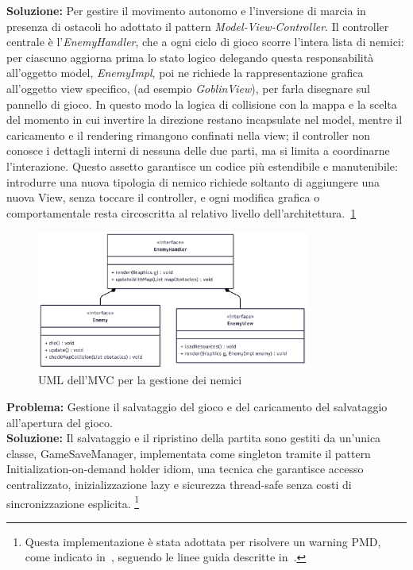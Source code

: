 \documentclass[a4paper,12pt]{report}
\begin{document}
\textbf{Soluzione:} Per gestire il movimento autonomo e l'inversione di marcia in presenza di ostacoli ho adottato 
il pattern \emph{Model‑View‑Controller}. Il controller centrale è l'\emph{EnemyHandler}, che a ogni ciclo di gioco scorre l'intera lista di 
nemici: per ciascuno aggiorna prima lo stato logico delegando questa responsabilità all'oggetto model, \emph{EnemyImpl}, poi ne richiede 
la rappresentazione grafica all'oggetto view specifico, (ad esempio \emph{GoblinView}), per farla disegnare sul pannello di gioco. In questo modo 
la logica di collisione con la mappa e la scelta del momento in cui invertire la direzione restano incapsulate nel model, 
mentre il caricamento e il rendering rimangono confinati nella view; il controller non conosce i dettagli interni di nessuna delle due parti, 
ma si limita a coordinarne l'interazione. 
Questo assetto garantisce un codice più estendibile e manutenibile: introdurre una nuova tipologia di nemico richiede soltanto 
di aggiungere una nuova View, senza toccare il controller, e ogni modifica grafica o comportamentale resta circoscritta al relativo livello dell'architettura.~\ref{fig:2.9}
\begin{figure}
    \centering
    \includegraphics[width=0.8\textwidth]{resources/enemyMvcUml.png}
    \caption{UML dell'MVC per la gestione dei nemici}
    \label{fig:2.9}
\end{figure}
\newpage
\textbf{Problema:} Gestione il salvataggio del gioco e del caricamento del salvataggio all'apertura del gioco.\\
\textbf{Soluzione:} Il salvataggio e il ripristino della partita sono gestiti da un'unica classe, GameSaveManager, implementata 
come singleton tramite il pattern Initialization-on-demand holder idiom, una tecnica che garantisce accesso centralizzato, 
inizializzazione lazy e sicurezza thread-safe senza costi di sincronizzazione esplicita. \footnote{Questa implementazione è stata
 adottata per risolvere un warning PMD, come indicato in~\cite{pmd-singleton}, seguendo le linee guida descritte in~\cite{wiki-holder}.}
\end{document}
